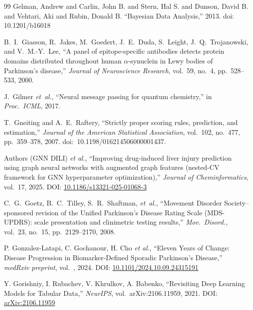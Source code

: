 \begin{thebibliography}{99}
 Gelman, Andrew and Carlin, John B. and Stern, Hal S. and Dunson, David B. and Vehtari, Aki and Rubin, Donald B. ``Bayesian Data Analysis,'' 2013. doi: 10.1201/b16018

B.~I.~Giasson, R.~Jakes, M.~Goedert, J.~E.~Duda, S.~Leight, J.~Q.~Trojanowski, and V.~M.-Y.~Lee, ``A panel of epitope-specific antibodies detects protein domains distributed throughout human $\alpha$-synuclein in Lewy bodies of Parkinson's disease,'' \textit{Journal of Neuroscience Research}, vol.~59, no.~4, pp.~528--533, 2000.


J.~Gilmer \textit{et~al.}, ``Neural message passing for quantum chemistry,'' in \textit{Proc.\ ICML}, 2017.

T.~Gneiting and A.~E.~Raftery, ``Strictly proper scoring rules, prediction, and estimation,'' \textit{Journal of the American Statistical Association}, vol.~102, no.~477, pp.~359--378, 2007. doi:~10.1198/016214506000001437.

Authors (GNN DILI) \textit{et al.},
``Improving drug-induced liver injury prediction using graph neural networks with augmented graph features (nested-CV framework for GNN hyperparameter optimization),''
\textit{Journal of Cheminformatics}, vol.~17, 2025. DOI: \href{https://doi.org/10.1186/s13321-025-01068-3}{10.1186/s13321-025-01068-3}

C.~G.~Goetz, B.~C.~Tilley, S.~R.~Shaftman, \textit{et~al.}, ``Movement Disorder Society--sponsored revision of the Unified Parkinson's Disease Rating Scale (MDS-UPDRS): scale presentation and clinimetric testing results,'' \textit{Mov.\ Disord.}, vol.~23, no.~15, pp.~2129--2170, 2008.

P. Gonzalez-Latapi, C. Gochanour, H. Cho \textit{et al.},
``Eleven Years of Change: Disease Progression in Biomarker-Defined Sporadic Parkinson's Disease,''
\textit{medRxiv preprint}, vol.~, 2024. DOI: \href{https://doi.org/10.1101/2024.10.09.24315191}{10.1101/2024.10.09.24315191}

Y. Gorishniy, I. Rubachev, V. Khrulkov, A. Babenko,
``Revisiting Deep Learning Models for Tabular Data,''
\textit{NeurIPS}, vol.~arXiv:2106.11959, 2021. DOI: \href{https://arxiv.org/abs/2106.11959}{arXiv:2106.11959}


\end{thebibliography}
